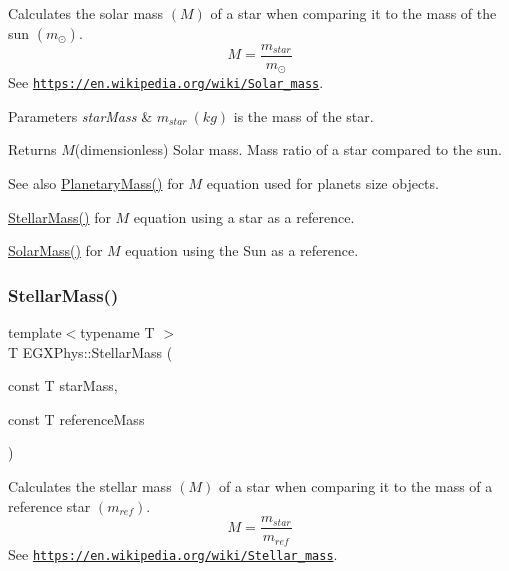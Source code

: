 Calculates the solar mass $(M)$ of a star when comparing it to the mass of the sun $(m_\odot)$. \[M=\frac{m_{star}}{m_\odot}\] See \href{https://en.wikipedia.org/wiki/Solar_mass}{\tt https\+://en.\+wikipedia.\+org/wiki/\+Solar\+\_\+mass}. 


\begin{DoxyParams}{Parameters}
{\em star\+Mass} & $m_{star}\ (kg)$ is the mass of the star. \\
\hline
\end{DoxyParams}
\begin{DoxyReturn}{Returns}
$M$(dimensionless) Solar mass. Mass ratio of a star compared to the sun. 
\end{DoxyReturn}
\begin{DoxySeeAlso}{See also}
\mbox{\hyperlink{group___e_g_x_phys-_planetary_mass_ga225bcf56fb37468f6d4d46493d403503}{Planetary\+Mass()}} for $M$ equation used for planets size objects. 

\mbox{\hyperlink{group___e_g_x_phys-_stellar_mass_ga6c1b42cfd62e3174709ddbf15a87b460}{Stellar\+Mass()}} for $M$ equation using a star as a reference. 

\mbox{\hyperlink{group___e_g_x_phys-_stellar_mass_ga4988f903a27ec9cfa63f72b003d876fd}{Solar\+Mass()}} for $M$ equation using the Sun as a reference. 
\end{DoxySeeAlso}
\mbox{\label{group___e_g_x_phys-_stellar_mass_ga6c1b42cfd62e3174709ddbf15a87b460}} 
\subsubsection{\texorpdfstring{Stellar\+Mass()}{StellarMass()}}
{\footnotesize\ttfamily template$<$typename T $>$ \\
T E\+G\+X\+Phys\+::\+Stellar\+Mass (\begin{DoxyParamCaption}\item[{const T}]{star\+Mass,  }\item[{const T}]{reference\+Mass }\end{DoxyParamCaption})}



Calculates the stellar mass $(M)$ of a star when comparing it to the mass of a reference star $(m_{ref})$. \[M=\frac{m_{star}}{m_{ref}}\] See \href{https://en.wikipedia.org/wiki/Stellar_mass}{\tt https\+://en.\+wikipedia.\+org/wiki/\+Stellar\+\_\+mass}. 


